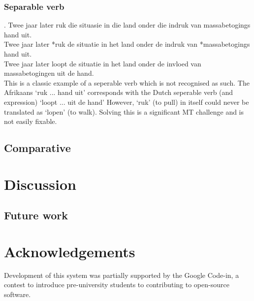 \documentclass[11pt]{article}
\newcommand{\confname}{EAMT 2011}
\begin{document}
\subsubsection{Separable verb}

\ex. \label{ex:exsepverb} 
    Twee jaar later ruk die situasie in die land onder die indruk van massabetogings hand uit. \\
    Twee jaar later *ruk de situatie in het land onder de indruk van *massabetogings hand uit. \\
    Twee jaar later loopt de situatie in het land onder de invloed van massabetogingen uit de hand. \\

This is a classic example of a seperable verb which is not recognised as such. The Afrikaans `ruk ... hand uit' corresponds with
 the Dutch seperable verb (and expression) `loopt ... uit de hand' However, `ruk' (to pull) in itself could never be translated as `lopen' (to walk). 
Solving this is a significant MT challenge and is not easily fixable.  

\subsection{Comparative}



\section{Discussion}

\subsection{Future work}

\section*{Acknowledgements}

Development of this system was partially supported by the Google Code-in,
a contest to introduce pre-university students to contributing to open-source
software.

% 
\end{document}

